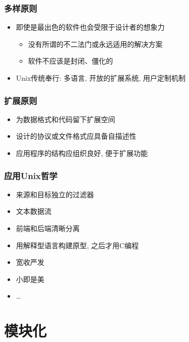 \documentclass[compress]{beamer}
\begin{document}
\begin{frame}
\frametitle{多样原则}

\begin{itemize}
\item 即使是最出色的软件也会受限于设计者的想象力
  \begin{itemize}
	\item 没有所谓的不二法门或永远适用的解决方案
	\item 软件不应该是封闭、僵化的
  \end{itemize}

\item Unix传统奉行: 多语言, 开放的扩展系统, 用户定制机制
\end{itemize}

\end{frame}

\begin{frame}
\frametitle{扩展原则}

\begin{itemize}
\item 为数据格式和代码留下扩展空间

\item 设计的协议或文件格式应具备自描述性

\item 应用程序的结构应组织良好, 便于扩展功能
\end{itemize}


\end{frame}

\begin{frame}
\frametitle{应用Unix哲学}

\begin{itemize}
\item 来源和目标独立的过滤器

\item 文本数据流

\item 前端和后端清晰分离

\item 用解释型语言构建原型, 之后才用C编程

\item 宽收严发

\item 小即是美

\item \ldots
\end{itemize}
\end{frame}

\section{模块化}
\end{document}

